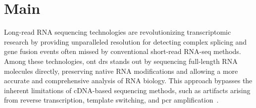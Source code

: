 \documentclass[pdflatex,sn-nature, lineno]{sn-jnl}%
\begin{document}
\maketitle

\section{Main}


Long-read RNA sequencing technologies are revolutionizing transcriptomic research by providing unparalleled resolution for detecting complex splicing and gene fusion events often missed by conventional short-read RNA-seq methods.
Among these technologies, \gls{ont} \gls{drs} stands out by sequencing full-length RNA molecules directly, preserving native RNA modifications and allowing a more accurate and comprehensive analysis of RNA biology.
This approach bypasses the inherent limitations of cDNA-based sequencing methods, such as artifacts arising from reverse transcription, template switching, and \gls{pcr} amplification~\cite{garalde2018highly, jain2022advances}.
\end{document}
